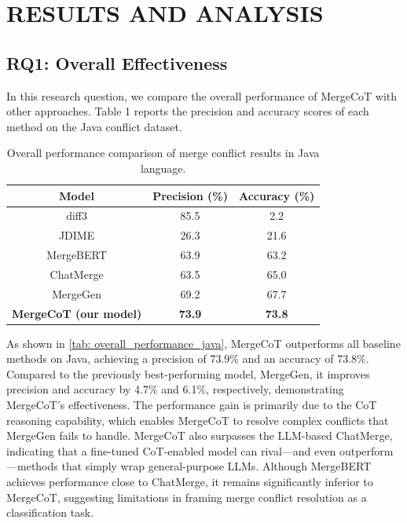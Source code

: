 \documentclass[sigconf,review,anonymous]{acmart}
\begin{document}
\section{RESULTS AND ANALYSIS}
\subsection{RQ1: Overall Effectiveness}
In this research question, we compare the overall performance of MergeCoT with other approaches. Table 1 reports the precision and accuracy scores of each method on the Java conflict dataset.

\begin{table}[ht]
\caption{Overall performance comparison of merge conflict results in Java language.}
\centering
\begin{tabular}{ccc}
\hline
\multicolumn{1}{c}{Model} & \multicolumn{1}{c}{Precision (\%)} & \multicolumn{1}{c}{Accuracy (\%)} \\ \hline
diff3                            & 85.5                               & 2.2                               \\
JDIME                            & 26.3                               & 21.6                              \\
MergeBERT                        & 63.9                               & 63.2                              \\
ChatMerge                        & 63.5                               & 65.0                              \\
MergeGen                         & 69.2                               & 67.7                              \\ \hline
\textbf{MergeCoT (our model)}    & \textbf{73.9}                      & \textbf{73.8}                     \\ \hline
\end{tabular}
\label{tab: overall_performance_java}
\end{table}


As shown in \autoref{tab: overall_performance_java}, MergeCoT outperforms all baseline methods on Java, achieving a precision of 73.9\% and an accuracy of 73.8\%. 
Compared to the previously best-performing model, MergeGen, it improves precision and accuracy by 4.7\% and 6.1\%, respectively, demonstrating MergeCoT's effectiveness. 
The performance gain is primarily due to the CoT reasoning capability, which enables MergeCoT to resolve complex conflicts that MergeGen fails to handle.
MergeCoT also surpasses the LLM-based ChatMerge, indicating that a fine-tuned CoT-enabled model can rival—and even outperform—methods that simply wrap general-purpose LLMs. Although MergeBERT achieves performance close to ChatMerge, it remains significantly inferior to MergeCoT, suggesting limitations in framing merge conflict resolution as a classification task.
\end{document}
